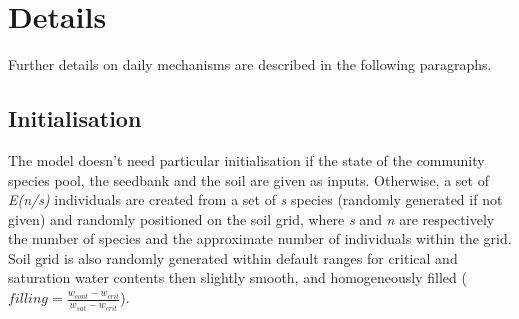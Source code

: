\documentclass[a4paper,twoside, justified,marginals=raggedright, nobib]{tufte-handout}
\begin{document}
%

\section{Details}

Further details on daily mechanisms are described in the following paragraphs.

\subsection{Initialisation}
The model doesn't need particular initialisation if the state of the community species pool, the seedbank and the soil are given as inputs. Otherwise, a set of \textit{E(n/s)} individuals are created from a set of \textit{s} species (randomly generated if not given) and randomly positioned on the soil grid, where \textit{s} and \textit{n} are respectively the number of species and the approximate number of individuals within the grid. Soil grid is also randomly generated within default ranges for critical and saturation water contents then slightly smooth, and homogeneously filled ($filling = \frac{w_{cont} - w_{crit}}{w_{sat} - w_{crit}}$).
\end{document}
